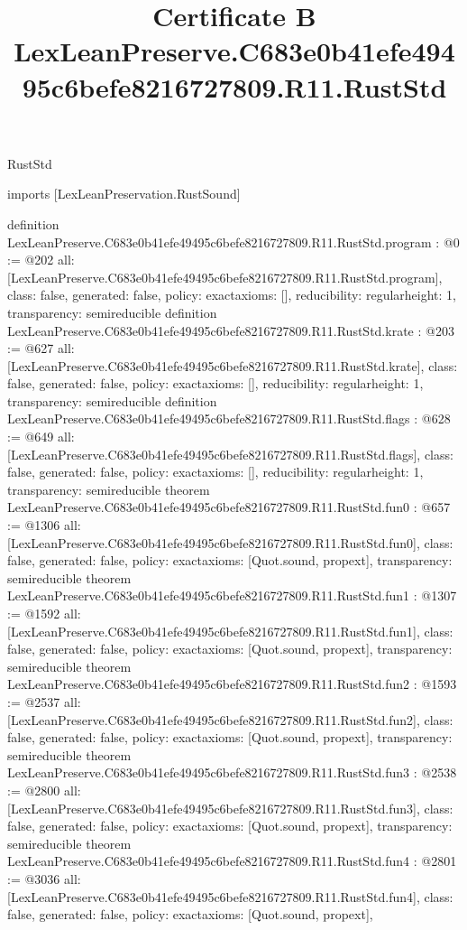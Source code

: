 \begin{lexlean}{RustStd}
\title{Certificate B LexLeanPreserve.C683e0b41efe49495c6befe8216727809.R11.RustStd}
\begin{coremodule}
imports [LexLeanPreservation.RustSound]

definition LexLeanPreserve.C683e0b41efe49495c6befe8216727809.R11.RustStd.program : @0 := @202 {
  all: [LexLeanPreserve.C683e0b41efe49495c6befe8216727809.R11.RustStd.program],
  class: false,
  generated: false,
  policy: exact{axioms: []},
  reducibility: regular{height: 1},
  transparency: semireducible
}
definition LexLeanPreserve.C683e0b41efe49495c6befe8216727809.R11.RustStd.krate : @203 := @627 {
  all: [LexLeanPreserve.C683e0b41efe49495c6befe8216727809.R11.RustStd.krate],
  class: false,
  generated: false,
  policy: exact{axioms: []},
  reducibility: regular{height: 1},
  transparency: semireducible
}
definition LexLeanPreserve.C683e0b41efe49495c6befe8216727809.R11.RustStd.flags : @628 := @649 {
  all: [LexLeanPreserve.C683e0b41efe49495c6befe8216727809.R11.RustStd.flags],
  class: false,
  generated: false,
  policy: exact{axioms: []},
  reducibility: regular{height: 1},
  transparency: semireducible
}
theorem LexLeanPreserve.C683e0b41efe49495c6befe8216727809.R11.RustStd.fun0 : @657 := @1306 {
  all: [LexLeanPreserve.C683e0b41efe49495c6befe8216727809.R11.RustStd.fun0],
  class: false,
  generated: false,
  policy: exact{axioms: [Quot.sound, propext]},
  transparency: semireducible
}
theorem LexLeanPreserve.C683e0b41efe49495c6befe8216727809.R11.RustStd.fun1 : @1307 := @1592 {
  all: [LexLeanPreserve.C683e0b41efe49495c6befe8216727809.R11.RustStd.fun1],
  class: false,
  generated: false,
  policy: exact{axioms: [Quot.sound, propext]},
  transparency: semireducible
}
theorem LexLeanPreserve.C683e0b41efe49495c6befe8216727809.R11.RustStd.fun2 : @1593 := @2537 {
  all: [LexLeanPreserve.C683e0b41efe49495c6befe8216727809.R11.RustStd.fun2],
  class: false,
  generated: false,
  policy: exact{axioms: [Quot.sound, propext]},
  transparency: semireducible
}
theorem LexLeanPreserve.C683e0b41efe49495c6befe8216727809.R11.RustStd.fun3 : @2538 := @2800 {
  all: [LexLeanPreserve.C683e0b41efe49495c6befe8216727809.R11.RustStd.fun3],
  class: false,
  generated: false,
  policy: exact{axioms: [Quot.sound, propext]},
  transparency: semireducible
}
theorem LexLeanPreserve.C683e0b41efe49495c6befe8216727809.R11.RustStd.fun4 : @2801 := @3036 {
  all: [LexLeanPreserve.C683e0b41efe49495c6befe8216727809.R11.RustStd.fun4],
  class: false,
  generated: false,
  policy: exact{axioms: [Quot.sound, propext]},
}
\end{coremodule}
\end{lexlean}
